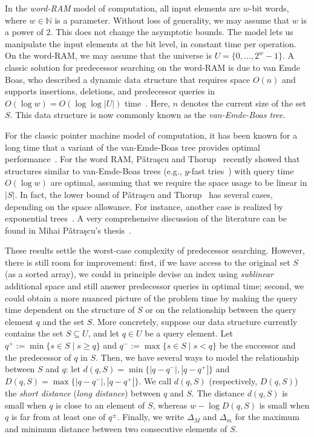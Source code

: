 \documentclass[a4paper,11pt]{article}
\newcommand{\N}{\mathbb{N}}
\newcommand{\?}{\mskip1.5mu}
\newcommand{\Patrascu}{P\v{a}tra\c{s}cu\xspace}
\begin{document}
In the \emph{word-RAM} model of computation, all input elements are 
$w$-bit words, where $w \in \N$ is a parameter. Without loss of 
generality, we may assume that $w$ is a power of $2$. This does not 
change the asymptotic bounds. The model lets us manipulate the input 
elements at the bit level, in constant time per operation. On the 
word-RAM, we may assume that the universe is 
$U = \{0, \dots, 2^{w}-1\}$. A classic solution for predecessor 
searching on the word-RAM is due to van Emde Boas, who described a 
dynamic data structure that requires space $O(n)$ and supports 
insertions, deletions, and predecessor queries in 
$O(\log w) = O(\log\log |U|)$ time~\cite{vEmdeBoas77,vEmdeBoasKaZi76,CormenLeRiSt09}.
Here, $n$ denotes the current size of the set $S$. This data 
structure is now commonly known as the 
\emph{van-Emde-Boas tree}.

For the classic pointer machine model of computation, it has been 
known for a long time that a variant of the van-Emde-Boas tree 
provides optimal performance~\cite{MehlhornNaAl88,Mulzer09}.
For the word RAM, \Patrascu and Thorup~\cite{PatrascuTh06,PatrascuTh07} 
recently showed that structures similar to van-Emde-Boas 
trees (e.g., $y$-fast tries~\cite{Willard83}) with query
time $O(\log w)$ are optimal, assuming that we require 
the space usage to be linear in $|S|$. In fact, the lower 
bound of \Patrascu and Thorup~\cite{PatrascuTh06,PatrascuTh07} 
has several cases, depending on the space allowance. 
For instance, another case is realized by exponential 
trees~\cite{AnderssonTh07}. A very comprehensive discussion 
of the literature can be found in Mihai \Patrascu's
thesis~\cite{Patrascu08}.

These results settle the worst-case complexity 
of predecessor searching. However, there is 
still room for improvement: first, if 
we have access to the original set $S$ (as a sorted array), 
we could in principle devise an index using 
\emph{sublinear} additional space and still answer 
predecessor queries in optimal time; second, we could
obtain a more nuanced picture of the problem time by 
making the query time dependent on the structure of $S$ 
or on the relationship between the query element $q$ 
and the set $S$. More concretely, suppose our data structure 
currently contains the set $S \subseteq U$, and let $q \in U$ 
be a query element.  Let $q^+ := \min\{s \in S \mid s \geq q \}$ and
$q^- := \max\{s \in S \mid s < q \}$ be the 
successor and the predecessor of $q$ in $S$.
Then, we have several ways to model the
relationship between $S$ and $q$: 
let $d(q, S) = \min\{|q - q^-|, |q - q^+|\}$ and 
$D(q, S) = \max\{|q - q^-|, |q - q^+|\}$.
We call $d(q,S)$ (respectively, $D(q,S)$) the \emph{short
distance} (\emph{long distance}) between $q$ and $S$. 
The distance $d(q, S)$ is small when $q$ is close to an 
element of $S$, whereas $w - \log D(q, S)$
is small when $q$ is far from at least one of $q^\pm$.
Finally, we write $\Delta_M$ and $\Delta_m$ for the maximum 
and minimum distance between two consecutive elements of $S$.
\end{document}
